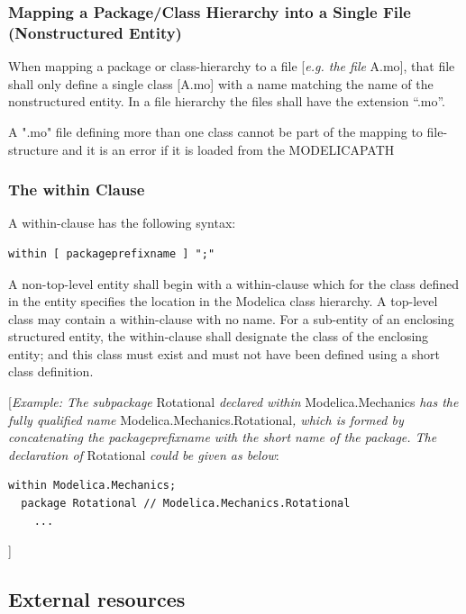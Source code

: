 \documentclass[10pt,a4paper]{report}
\def\doublelabel#1{\label{#1}}
\begin{document}
\subsubsection{Mapping a Package/Class Hierarchy into a Single File (Nonstructured Entity)}\doublelabel{mapping-a-package-class-hierarchy-into-a-single-file-nonstructured-entity}

When mapping a package or class-hierarchy to a file {[}\emph{e.g. the
  file} A.mo{]}, that file shall only define a single class {[}A.mo{]} with a
name matching the name of the nonstructured entity. In a file hierarchy
the files shall have the extension ``.mo''.

A ".mo" file defining more than one class cannot be part of the mapping
to file-structure and it is an error if it is loaded from the
MODELICAPATH

\subsubsection{The within Clause}\doublelabel{the-within-clause}

A within-clause has the following syntax:

\begin{lstlisting}[language=grammar]
  within [ packageprefixname ] ";"
\end{lstlisting}
  A non-top-level entity shall begin with a within-clause which for the
  class defined in the entity specifies the location in the Modelica class
    hierarchy. A top-level class may contain a within-clause with no name.
    For a sub-entity of an enclosing structured entity, the within-clause
shall designate the class of the enclosing entity; and this class must
exist and must not have been defined using a short class definition.

{[}\emph{Example: The subpackage} Rotational \emph{declared within}
Modelica.Mechanics \emph{has the fully qualified name}
Modelica.Mechanics.Rotational\emph{, which is formed by concatenating
the packageprefixname with the short name of the package. The
declaration of} Rotational \emph{could be given as below}:

\begin{lstlisting}[language=modelica]
  within Modelica.Mechanics;
  package Rotational // Modelica.Mechanics.Rotational
    ...
\end{lstlisting}
{]}

\subsection{External resources}\doublelabel{external-resources}
\end{document}
